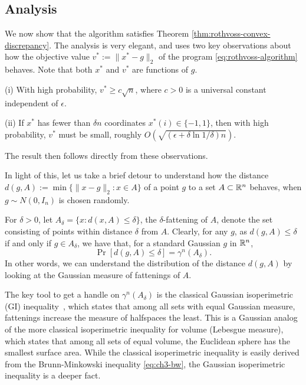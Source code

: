 \subsection{Analysis}
We now show that the algorithm satisfies Theorem \ref{thm:rothvoss-convex-discrepancy}. The analysis is very elegant, and uses two key observations about how 
the objective value $v^*:=\|x^*-g\|_2$ of the program \eqref{eq:rothvoss-algorithm} behaves. Note that both $x^*$
and $v^*$ are functions of $g$.
\medskip 

(i) With high probability, $v^* \geq c\sqrt{n}$, where $c>0$ is a universal constant independent of $\epsilon$. 

\medskip
(ii) If $x^*$ has fewer than $\delta n$ coordinates $x^*(i) \in \{-1,1\}$, then with high probability, $v^*$ must be small, roughly $O(\sqrt{(\epsilon + \delta \ln 1/\delta) n})$. 


\medskip 
\noindent The result then follows directly from these observations.


\medskip

In light of this, let us take a brief detour to understand how the distance
$d(g,A):= \min\{\|x-g\|_2: x\in A\}$
of a point $g$ to a set $A \subset \mathbb{R}^n$ behaves, when $g \sim N(0,I_n)$ is chosen randomly. 

\medskip 
{}
 For $\delta>0$, let $A_\delta = \{x:d(x,A)\leq \delta\}$, the $\delta$-fattening of $A$, denote the set consisting of points within distance $\delta$ from $A$.
 Clearly, for any $g$,
 as $d(g,A) \leq \delta$ if and only if $g \in A_\delta$, we have that, for a standard Gaussian $g$ in $\mathbb{R}^n$,  \[\Pr[d(g,A) \leq \delta] = \gamma^n(A_\delta).\] 
 In other words, we can understand the distribution of the distance $d(g,A)$ by looking at the Gaussian measure of fattenings of $A$. 

 \smallskip
 The key tool to get a handle on $\gamma^n(A_\delta)$ is the classical Gaussian isoperimetric (GI) inequality~\cite{Borell75}, which states that among all sets with equal Gaussian measure, fattenings increase the measure of halfspaces the least. This is a Gaussian analog of the more classical isoperimetric inequality for volume (Lebesgue measure), which states that among all sets of equal volume, the Euclidean sphere has the smallest surface area. While the classical isoperimetric inequality is easily derived from the Brunn-Minkowski inequality \eqref{eq:ch3-bw}, the Gaussian isoperimetric inequality is a deeper fact. 
  
